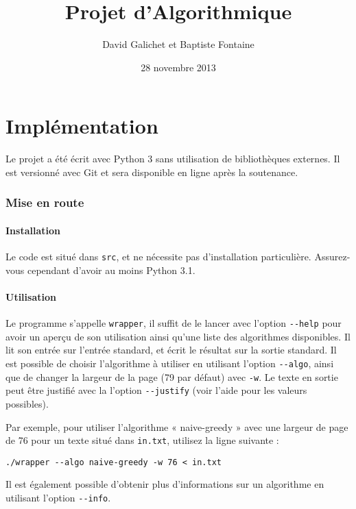 \documentclass[a4paper, 11pt]{article}
\begin{document}
\title{Projet d'Algorithmique}
\author{David Galichet et Baptiste Fontaine}
\date{28 novembre 2013}
\maketitle
\tableofcontents
\newpage


\part{Implémentation}

Le projet a été écrit avec Python 3 sans utilisation de bibliothèques externes.
Il est versionné avec Git et sera disponible en ligne après la soutenance.

\section{Mise en route}
\subsection{Installation}

Le code est situé dans \verb|src|, et ne nécessite pas d'installation
particulière. Assurez-vous cependant d'avoir au moins Python 3.1.

\subsection{Utilisation}

Le programme s'appelle \verb|wrapper|, il suffit de le lancer avec l'option
\verb|--help| pour avoir un aperçu de son utilisation ainsi qu'une liste des
algorithmes disponibles. Il lit son entrée sur l'entrée standard, et écrit le
résultat sur la sortie standard. Il est possible de choisir l'algorithme à
utiliser en utilisant l'option \verb|--algo|, ainsi que de changer la largeur
de la page (79 par défaut) avec \verb|-w|. Le texte en sortie peut être
justifié avec la l'option \verb|--justify| (voir l'aide pour les valeurs
possibles).

Par exemple, pour utiliser l'algorithme « naive-greedy » avec une largeur de
page de 76 pour un texte situé dans \verb|in.txt|, utilisez la ligne suivante :

\begin{verbatim}
./wrapper --algo naive-greedy -w 76 < in.txt
\end{verbatim}

Il est également possible d'obtenir plus d'informations sur un algorithme en
utilisant l'option \verb|--info|.
\end{document}
